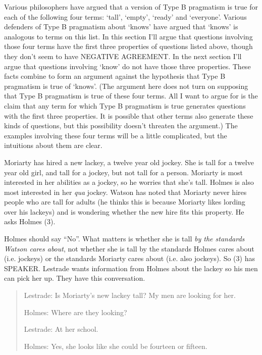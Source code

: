 Various philosophers have argued that a version of Type B pragmatism is true for each of the following four terms: `tall', `empty', `ready' and `everyone'. Various defenders of Type B pragmatism about `knows' have argued that `knows' is analogous to terms on this list. In this section I'll argue that questions involving those four terms have the first three properties of questions listed above, though they don't seem to have NEGATIVE AGREEMENT. In the next section I'll argue that questions involving `know' do not have those three properties. These facts combine to form an argument against the hypothesis that Type B pragmatism is true of `knows'. (The argument here does not turn on supposing that Type B pragmatism is true of these four terms. All I want to argue for is the claim that any term for which Type B pragmatism is true generates questions with the first three properties. It is possible that other terms also generate these kinds of questions, but this possibility doesn't threaten the argument.) The examples involving these four terms will be a little complicated, but the intuitions about them are clear.

Moriarty has hired a new lackey, a twelve year old jockey. She is tall for a twelve year old girl, and tall for a jockey, but not tall for a person. Moriarty is most interested in her abilities as a jockey, so he worries that she's tall. Holmes is also most interested in her \textit{qua }jockey. Watson has noted that Moriarty never hires people who are tall for adults (he thinks this is because Moriarty likes lording over his lackeys) and is wondering whether the new hire fits this property. He asks Holmes (3).


\noindent Holmes should say ``No''. What matters is whether she is tall \textit{by the standards Watson cares about}, not whether she is tall by the standards Holmes cares about (i.e. jockeys) or the standards Moriarty cares about (i.e. also jockeys). So (3) has SPEAKER. Lestrade wants information from Holmes about the lackey so his men can pick her up. They have this conversation.

\begin{quote}
Lestrade: Is Moriarty's new lackey tall? My men are looking for her.

Holmes: Where are they looking?

Lestrade: At her school.

Holmes: Yes, she looks like she could be fourteen or fifteen.
\end{quote}

